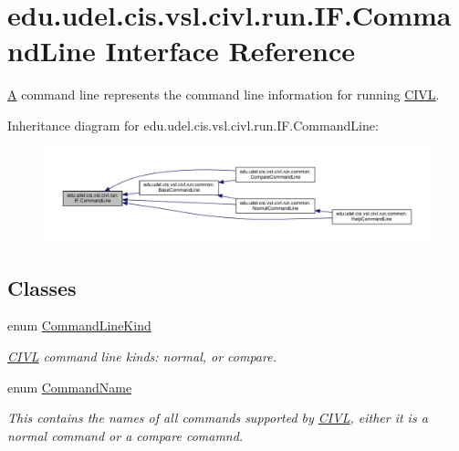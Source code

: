 \hypertarget{interfaceedu_1_1udel_1_1cis_1_1vsl_1_1civl_1_1run_1_1IF_1_1CommandLine}{}\section{edu.\+udel.\+cis.\+vsl.\+civl.\+run.\+I\+F.\+Command\+Line Interface Reference}
\label{interfaceedu_1_1udel_1_1cis_1_1vsl_1_1civl_1_1run_1_1IF_1_1CommandLine}


\hyperlink{structA}{A} command line represents the command line information for running \hyperlink{classedu_1_1udel_1_1cis_1_1vsl_1_1civl_1_1CIVL}{C\+I\+V\+L}.  




Inheritance diagram for edu.\+udel.\+cis.\+vsl.\+civl.\+run.\+I\+F.\+Command\+Line\+:
\nopagebreak
\begin{figure}[H]
\begin{center}
\leavevmode
\includegraphics[width=350pt]{interfaceedu_1_1udel_1_1cis_1_1vsl_1_1civl_1_1run_1_1IF_1_1CommandLine__inherit__graph}
\end{center}
\end{figure}
\subsection*{Classes}
\begin{DoxyCompactItemize}
\item 
enum \hyperlink{enumedu_1_1udel_1_1cis_1_1vsl_1_1civl_1_1run_1_1IF_1_1CommandLine_1_1CommandLineKind}{Command\+Line\+Kind}
\begin{DoxyCompactList}\small\item\em \hyperlink{classedu_1_1udel_1_1cis_1_1vsl_1_1civl_1_1CIVL}{C\+I\+V\+L} command line kinds\+: normal, or compare. \end{DoxyCompactList}\item 
enum \hyperlink{enumedu_1_1udel_1_1cis_1_1vsl_1_1civl_1_1run_1_1IF_1_1CommandLine_1_1CommandName}{Command\+Name}
\begin{DoxyCompactList}\small\item\em This contains the names of all commands supported by \hyperlink{classedu_1_1udel_1_1cis_1_1vsl_1_1civl_1_1CIVL}{C\+I\+V\+L}, either it is a normal command or a compare comamnd. \end{DoxyCompactList}\end{DoxyCompactItemize}
